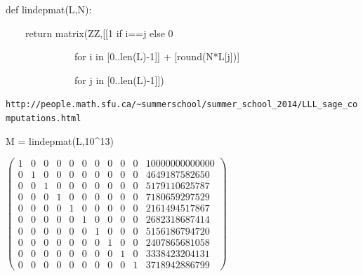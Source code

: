 \documentclass{beamer}
\begin{document}
\begin{frame}
\begin{semiverbatim}
\small

def lindepmat(L,N):

\ \ \ \ return matrix(ZZ,[[1 if i==j else 0

\ \ \ \ \ \ \ \ \ \ \ \ \ \   for i in [0..len(L)-1]] + [round(N*L[j])]

\ \ \ \ \ \ \ \ \ \ \ \ \ \   for j in [0..len(L)-1]])

{\tiny {\tt http://people.math.sfu.ca/\~{}summerschool/summer\_school\_2014/LLL\_sage\_computations.html}}



M = lindepmat(L,10\^{}13)


$\left(\begin{array}{rrrrrrrrrrr}
1 & 0 & 0 & 0 & 0 & 0 & 0 & 0 & 0 & 0 & 10000000000000 \\
0 & 1 & 0 & 0 & 0 & 0 & 0 & 0 & 0 & 0 & 4649187582650 \\
0 & 0 & 1 & 0 & 0 & 0 & 0 & 0 & 0 & 0 & 5179110625787 \\
0 & 0 & 0 & 1 & 0 & 0 & 0 & 0 & 0 & 0 & 7180659297529 \\
0 & 0 & 0 & 0 & 1 & 0 & 0 & 0 & 0 & 0 & 2161494517867 \\
0 & 0 & 0 & 0 & 0 & 1 & 0 & 0 & 0 & 0 & 2682318687414 \\
0 & 0 & 0 & 0 & 0 & 0 & 1 & 0 & 0 & 0 & 5156186794720 \\
0 & 0 & 0 & 0 & 0 & 0 & 0 & 1 & 0 & 0 & 2407865681058 \\
0 & 0 & 0 & 0 & 0 & 0 & 0 & 0 & 1 & 0 & 3338423204131 \\
0 & 0 & 0 & 0 & 0 & 0 & 0 & 0 & 0 & 1 & 3718942886799
\end{array}\right)
$

\end{semiverbatim}
\end{frame}
\end{document}
